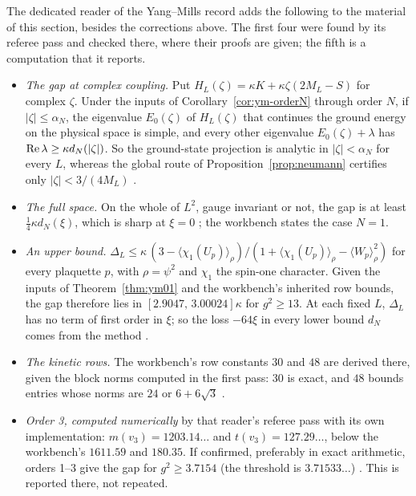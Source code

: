 The dedicated reader of the Yang--Mills record \cite{YMReader} adds the following to the material of this section, besides the corrections above. The first four were found by its referee pass and checked there, where their proofs are given; the fifth is a computation that it reports.
\begin{itemize}
\item \emph{The gap at complex coupling.} Put $H_L(\zeta)=\kappa K+\kappa\zeta(2M_L-S)$ for complex $\zeta$. Under the inputs of Corollary~\ref{cor:ym-orderN} through order $N$, if $|\zeta|\le\alpha_N$, the eigenvalue $E_0(\zeta)$ of $H_L(\zeta)$ that continues the ground energy on the physical space is simple, and every other eigenvalue $E_0(\zeta)+\lambda$ has $\operatorname{Re}\lambda\ge\kappa d_N(|\zeta|)$. So the ground-state projection is analytic in $|\zeta|<\alpha_N$ for every $L$, whereas the global route of Proposition~\ref{prop:neumann} certifies only $|\zeta|<3/(4M_L)$ \cite[Proposition~3.8]{YMReader}.
\item \emph{The full space.} On the whole of $L^2$, gauge invariant or not, the gap is at least $\frac14\kappa d_N(\xi)$, which is sharp at $\xi=0$ \cite[Corollary~3.7]{YMReader}; the workbench states the case $N=1$.
\item \emph{An upper bound.} $\Delta_L\le\kappa\,(3-\langle\chi_1(U_p)\rangle_\rho)/(1+\langle\chi_1(U_p)\rangle_\rho-\langle W_p\rangle_\rho^2)$ for every plaquette $p$, with $\rho=\psi^2$ and $\chi_1$ the spin-one character. Given the inputs of Theorem~\ref{thm:ym01} and the workbench's inherited row bounds, the gap therefore lies in $[2.9047,\,3.00024]\kappa$ for $g^2\ge13$. At each fixed $L$, $\Delta_L$ has no term of first order in $\xi$; so the loss $-64\xi$ in every lower bound $d_N$ comes from the method \cite[Proposition~4.6]{YMReader}.
\item \emph{The kinetic rows.} The workbench's row constants $30$ and $48$ are derived there, given the block norms computed in the first pass: $30$ is exact, and $48$ bounds entries whose norms are $24$ or $6+6\sqrt3$ \cite[Proposition~4.4]{YMReader}.
\item \emph{Order 3, computed numerically} by that reader's referee pass with its own implementation: $m(v_3)=1203.14\ldots$ and $t(v_3)=127.29\ldots$, below the workbench's $1611.59$ and $180.35$. If confirmed, preferably in exact arithmetic, orders 1--3 give the gap for $g^2\ge3.7154$ (the threshold is $3.71533\ldots$) \cite[§9.1]{YMReader}. This is reported there, not repeated.
\end{itemize}

